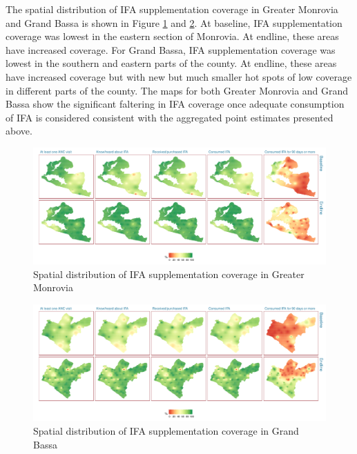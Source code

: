 \documentclass[12pt,a4paper]{article}
\begin{document}
The spatial distribution of IFA supplementation coverage in Greater Monrovia and Grand Bassa is shown in Figure \ref{fig:ifa1map} and \ref{fig:ifa2map}. At baseline, IFA supplementation coverage was lowest in the eastern section of Monrovia. At endline, these areas have increased coverage. For Grand Bassa, IFA supplementation coverage was lowest in the southern and eastern parts of the county. At endline, these areas have increased coverage but with new but much smaller hot spots of low coverage in different parts of the county. The maps for both Greater Monrovia and Grand Bassa show the significant faltering in IFA coverage once adequate consumption of IFA is considered consistent with the aggregated point estimates presented above.

\begin{figure}[H]

{\centering \includegraphics{liberiaCoverageFinalReport_files/figure-latex/ifa1map-1} 

}

\caption{Spatial distribution of IFA supplementation coverage in Greater Monrovia}\label{fig:ifa1map}
\end{figure}

\begin{figure}[H]

{\centering \includegraphics{liberiaCoverageFinalReport_files/figure-latex/ifa2map-1} 

}

\caption{Spatial distribution of IFA supplementation coverage in Grand Bassa}\label{fig:ifa2map}
\end{figure}
\end{document}
